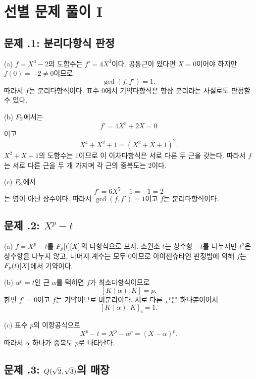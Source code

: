 \section{선별 문제 풀이 I}
\label{sec:separability-solutions-a}

\subsection*{문제 \thechapter.1: 분리다항식 판정}

\begin{solution}
(a) $f=X^4-2$의 도함수는 $f'=4X^3$이다. 공통근이 있다면 $X=0$이어야 하지만 $f(0)=-2\ne0$이므로
\[
  \gcd(f,f')=1.
\]
따라서 $f$는 분리다항식이다. 표수 $0$에서 기약다항식은 항상 분리라는 사실로도 판정할 수 있다.

(b) $F_2$에서는
\[
  f'=4X^3+2X=0
\]
이고
\[
  X^4+X^2+1=(X^2+X+1)^2.
\]
$X^2+X+1$의 도함수는 $1$이므로 이 이차다항식은 서로 다른 두 근을 갖는다. 따라서 $f$는 서로 다른 근을 두 개 가지며 각 근의 중복도는 $2$이다.

(c) $F_3$에서
\[
  f'=6X^5-1=-1=2
\]
는 영이 아닌 상수이다. 따라서 $\gcd(f,f')=1$이고 $f$는 분리다항식이다.
\end{solution}

\subsection*{문제 \thechapter.2: $X^p-t$}

\begin{solution}
(a) $f=X^p-t$를 $F_p[t][X]$의 다항식으로 보자. 소원소 $t$는 상수항 $-t$를 나누지만 $t^2$은 상수항을 나누지 않고, 나머지 계수는 모두 $0$이므로 아이젠슈타인 판정법에 의해 $f$는 $F_p(t)[X]$에서 기약이다.

(b) $\alpha^p=t$인 근 $\alpha$를 택하면 $f$가 최소다항식이므로
\[
  [K(\alpha):K]=p.
\]
한편 $f'=0$이고 $f$는 기약이므로 비분리이다. 서로 다른 근은 하나뿐이어서
\[
  [K(\alpha):K]_{\mathrm s}=1.
\]

(c) 표수 $p$의 이항공식으로
\[
  X^p-t=X^p-\alpha^p=(X-\alpha)^p.
\]
따라서 $\alpha$ 하나가 중복도 $p$로 나타난다.
\end{solution}

\subsection*{문제 \thechapter.3: $Q(\sqrt2,\sqrt3)$의 매장}


